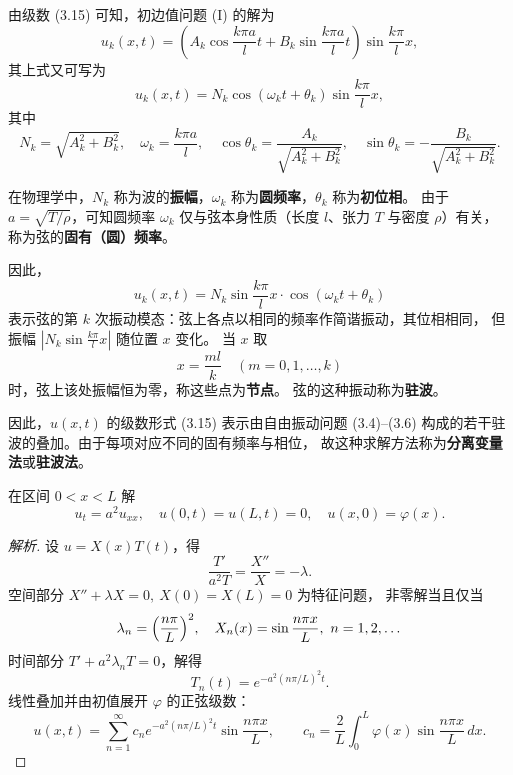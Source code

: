 \begin{proposition}[解的物理意义]
由级数 (3.15) 可知，初边值问题 (I) 的解为
\[
u_k(x,t)=
\left(A_k\cos\frac{k\pi a}{l}t
     +B_k\sin\frac{k\pi a}{l}t\right)
     \sin\frac{k\pi}{l}x,
\]
其上式又可写为
\[
u_k(x,t)=N_k\cos(\omega_k t+\theta_k)
          \sin\frac{k\pi}{l}x, \tag{3.19}
\]
其中
\[
N_k=\sqrt{A_k^2+B_k^2},\quad
\omega_k=\frac{k\pi a}{l},\quad
\cos\theta_k=\frac{A_k}{\sqrt{A_k^2+B_k^2}},\quad
\sin\theta_k=-\frac{B_k}{\sqrt{A_k^2+B_k^2}}.
\]

在物理学中，\(N_k\) 称为波的\textbf{振幅}，\(\omega_k\) 称为\textbf{圆频率}，\(\theta_k\) 称为\textbf{初位相}。
由于 \(a=\sqrt{T/\rho}\)，可知圆频率 \(\omega_k\) 仅与弦本身性质（长度 \(l\)、张力 \(T\) 与密度 \(\rho\)）有关，
称为弦的\textbf{固有（圆）频率}。

因此，
\[
u_k(x,t)=N_k\sin\frac{k\pi}{l}x\cdot\cos(\omega_k t+\theta_k)
\]
表示弦的第 \(k\) 次振动模态：弦上各点以相同的频率作简谐振动，其位相相同，
但振幅 \(|N_k\sin\frac{k\pi}{l}x|\) 随位置 \(x\) 变化。
当 \(x\) 取
\[
x=\frac{ml}{k}\quad(m=0,1,\dots,k)
\]
时，弦上该处振幅恒为零，称这些点为\textbf{节点}。
弦的这种振动称为\textbf{驻波}。

因此，\(u(x,t)\) 的级数形式 (3.15) 表示由自由振动问题 (3.4)–(3.6)
构成的若干驻波的叠加。由于每项对应不同的固有频率与相位，
故这种求解方法称为\textbf{分离变量法}或\textbf{驻波法}。
\end{proposition}
\begin{example}
在区间 $0<x<L$ 解
\[
u_t=a^2u_{xx},\quad u(0,t)=u(L,t)=0,\quad u(x,0)=\varphi(x).
\]
\end{example}
\begin{proof}[解析]
设 $u=X(x)T(t)$，得
\[
\frac{T'}{a^2T}=\frac{X''}{X}=-\lambda.
\]
空间部分 $X''+\lambda X=0,\ X(0)=X(L)=0$ 为特征问题，
非零解当且仅当
\[
\lambda_n=\Bigl(\frac{n\pi}{L}\Bigr)^2,\quad X_n(x)=\sin\frac{n\pi x}{L},\ n=1,2,\dots
\]
时间部分 $T'+a^2\lambda_nT=0$，解得
\[
T_n(t)=e^{-a^2(n\pi/L)^2t}.
\]
线性叠加并由初值展开 $\varphi$ 的正弦级数：
\[
u(x,t)=\sum_{n=1}^\infty c_n e^{-a^2(n\pi/L)^2t}\sin\frac{n\pi x}{L},
\qquad
c_n=\frac{2}{L}\int_0^L\varphi(x)\sin\frac{n\pi x}{L}\,dx.
\]
\end{proof}

